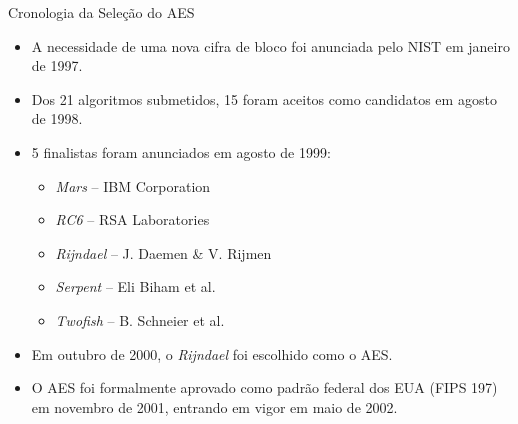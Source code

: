 \documentclass{beamer}
\begin{document}

\begin{frame}{Cronologia da Seleção do AES}

\begin{itemize}
    \item A necessidade de uma nova cifra de bloco foi anunciada pelo NIST em janeiro de 1997.
    \item Dos 21 algoritmos submetidos, 15 foram aceitos como candidatos em agosto de 1998.
    \item 5 finalistas foram anunciados em agosto de 1999:
    \begin{itemize}
        \item \textit{Mars} – IBM Corporation
        \item \textit{RC6} – RSA Laboratories
        \item \textit{Rijndael} – J. Daemen \& V. Rijmen
        \item \textit{Serpent} – Eli Biham et al.
        \item \textit{Twofish} – B. Schneier et al.
    \end{itemize}
    \item Em outubro de 2000, o \textit{Rijndael} foi escolhido como o AES.
    \item O AES foi formalmente aprovado como padrão federal dos EUA (FIPS 197) em novembro de 2001, entrando em vigor em maio de 2002.
\end{itemize}

\end{frame}

\end{document}
